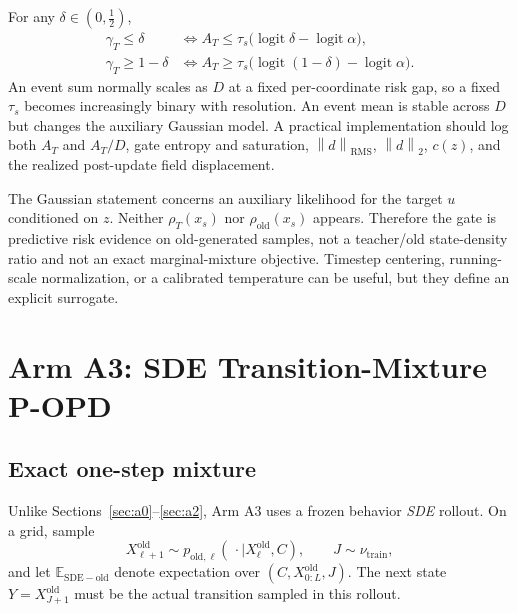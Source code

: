 \documentclass[11pt,a4paper]{article}
\newcommand{\E}{\mathbb{E}}
\newcommand{\norm}[1]{\left\lVert #1 \right\rVert}
\DeclareMathOperator{\logit}{logit}
\theoremstyle{plain}
\theoremstyle{definition}
\begin{document}
For any $\delta\in(0,\tfrac12)$,
\begin{align}
\gamma_T\le\delta
&\iff
A_T\le
\tau_s\bigl(\logit\delta-\logit\alpha\bigr),\\
\gamma_T\ge1-\delta
&\iff
A_T\ge
\tau_s\bigl(\logit(1-\delta)-\logit\alpha\bigr).
\label{eq:a2-saturation}
\end{align}
An event sum normally scales as $D$ at a fixed per-coordinate risk gap, so a fixed $\tau_s$
becomes increasingly binary with resolution.  An event mean is stable across $D$ but changes the
auxiliary Gaussian model.  A practical implementation should log both $A_T$ and $A_T/D$, gate
entropy and saturation, $\norm{d}_{\mathrm{RMS}}$, $\norm{d}_{2}$, $c(z)$, and the realized
post-update field displacement.

\begin{tcolorbox}[colback=yellow!5,colframe=yellow!45!black,title=Exact boundary of Arm A2]
The Gaussian statement concerns an auxiliary likelihood for the target $u$ conditioned on $z$.
Neither $\rho_T(x_s)$ nor $\rho_{\mathrm{old}}(x_s)$ appears.  Therefore the gate is predictive
risk evidence on old-generated samples, not a teacher/old state-density ratio and not an exact
marginal-mixture objective.  Timestep centering, running-scale normalization, or a calibrated
temperature can be useful, but they define an explicit surrogate.
\end{tcolorbox}

\section{Arm A3: SDE Transition-Mixture P-OPD}
\label{sec:a3}

\subsection{Exact one-step mixture}

Unlike Sections~\ref{sec:a0}--\ref{sec:a2}, Arm A3 uses a frozen behavior \emph{SDE} rollout.
On a grid, sample
\begin{equation}
X_{\ell+1}^{\mathrm{old}}
\sim
p_{\mathrm{old},\ell}(
  \,\cdot\mid X_\ell^{\mathrm{old}},C
),
\qquad
J\sim\nu_{\mathrm{train}},
\label{eq:a3-behavior-rollout}
\end{equation}
and let $\E_{\mathrm{SDE-old}}$ denote expectation over
$(C,X_{0:L}^{\mathrm{old}},J)$.  The next state
$Y=X_{J+1}^{\mathrm{old}}$ must be the actual transition sampled in this rollout.
\end{document}
